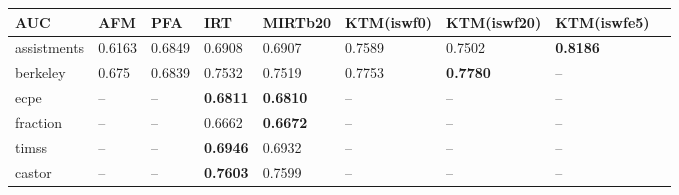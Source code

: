 \begin{tabular}{lllllllll}
\toprule
AUC &     AFM &     PFA &              IRT &                    MIRTb20 & KTM(iswf0) &      KTM(iswf20) & KTM(iswfe5) \\
\midrule
assistments         &  0.6163 &  0.6849 &           0.6908 &                      0.6907 &     0.7589 &           0.7502 &          \textbf{0.8186} \\
berkeley            &   0.675 &  0.6839 &           0.7532 &                      0.7519 &     0.7753 &  \textbf{0.7780} &          -- \\
ecpe                &      -- &      -- &  \textbf{0.6811} &             \textbf{0.6810} &         -- &               -- &          -- \\
fraction            &      -- &      -- &           0.6662 &             \textbf{0.6672} &         -- &               -- &          -- \\
timss           &      -- &      -- &  \textbf{0.6946} &                      0.6932 &         -- &               -- &          -- \\
castor            &      -- &      -- &  \textbf{0.7603} &             0.7599 &         -- &               -- &          -- \\
\bottomrule
\end{tabular}
